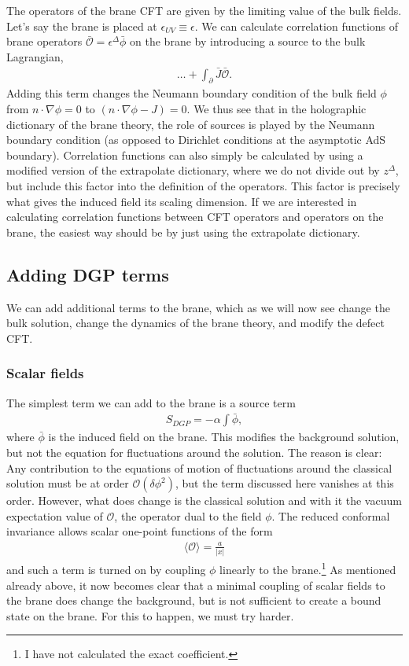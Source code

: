 The operators of the brane CFT are given by the limiting value of the bulk fields. Let's say the brane is placed at $\epsilon_{UV} \equiv \epsilon$. We can calculate correlation functions of brane operators $\bar {\mathcal O} = \epsilon^\Delta \bar \phi$ on the brane by introducing a source to the bulk Lagrangian,
\begin{align}
    \dots + \int_{\partial} \bar J \bar {\mathcal O}.
\end{align}
Adding this term changes the Neumann boundary condition of the bulk field $\phi$ from $n \cdot \nabla \phi = 0$ to $(n \cdot \nabla \phi - J) = 0$. We thus see that in the holographic dictionary of the brane theory, the role of sources is played by the Neumann boundary condition (as opposed to Dirichlet conditions at the asymptotic AdS boundary). Correlation functions can also simply be calculated by using a modified version of the extrapolate dictionary, where we do not divide out by $z^\Delta$, but include this factor into the definition of the operators. This factor is precisely what gives the induced field its scaling dimension. If we are interested in calculating correlation functions between CFT operators and operators on the brane, the easiest way should be by just using the extrapolate dictionary.

\subsection{Adding DGP terms}
We can add additional terms to the brane, which as we will now see change the bulk solution, change the dynamics of the brane theory, and modify the defect CFT.
\subsubsection{Scalar fields}
The simplest term we can add to the brane is a source term
\begin{align}
    S_{DGP} = -\alpha \int \bar \phi,
\end{align}
where $\bar \phi$ is the induced field on the brane. This modifies the background solution, but not the equation for fluctuations around the solution. The reason is clear: Any contribution to the equations of motion of fluctuations around the classical solution must be at order $\mathcal O(\delta \phi^2)$, but the term discussed here vanishes at this order. However, what does change is the classical solution and with it the vacuum expectation value of $\mathcal O$, the operator dual to the field $\phi$. The reduced conformal invariance allows scalar one-point functions of the form 
\begin{align}
    \langle \mathcal O \rangle = \frac a {|x|}
\end{align}
and such a term is turned on by coupling $\phi$ linearly to the brane.\footnote{I have not calculated the exact coefficient.} As mentioned already above, it now becomes clear that a minimal coupling of scalar fields to the brane does change the background, but is not sufficient to create a bound state on the brane. For this to happen, we must try harder.

